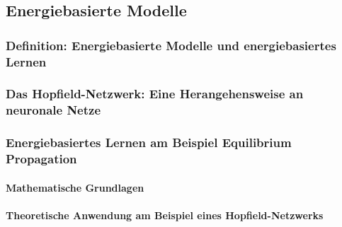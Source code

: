 \subsection{Energiebasierte Modelle}

\subsubsection{Definition: Energiebasierte Modelle und energiebasiertes Lernen}

\subsubsection{Das Hopfield-Netzwerk: Eine Herangehensweise an neuronale Netze}

\subsubsection{Energiebasiertes Lernen am Beispiel Equilibrium Propagation}

\paragraph{Mathematische Grundlagen}

\paragraph{Theoretische Anwendung am Beispiel eines Hopfield-Netzwerks}

